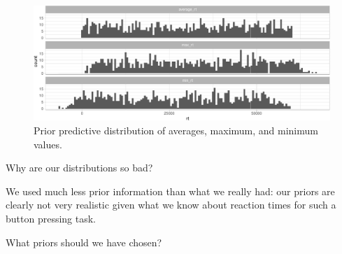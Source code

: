 \documentclass[12pt,ignorenonframetext,aspectratio=169]{beamer}
\newenvironment{Shaded}{\begin{snugshade}}{\end{snugshade}}
\newcommand{\DataTypeTok}[1]{\textcolor[rgb]{0.13,0.29,0.53}{#1}}
\newcommand{\DecValTok}[1]{\textcolor[rgb]{0.00,0.00,0.81}{#1}}
\newcommand{\KeywordTok}[1]{\textcolor[rgb]{0.13,0.29,0.53}{\textbf{#1}}}
\newcommand{\NormalTok}[1]{#1}
\newcommand{\OperatorTok}[1]{\textcolor[rgb]{0.81,0.36,0.00}{\textbf{#1}}}
\newcommand{\StringTok}[1]{\textcolor[rgb]{0.31,0.60,0.02}{#1}}
\begin{document}
\begin{frame}[fragile]



\scriptsize

\begin{Shaded}
\end{Shaded}

\begin{figure}
\centering
\includegraphics{03-compbayes-slides_files/figure-beamer/priorpred-stats-1.pdf}
\caption{\label{fig:priorpred-stats}Prior predictive distribution of averages, maximum, and minimum values.}
\end{figure}

\normalsize

\end{frame}

\begin{frame}

\begin{block}{Why are our distributions so bad?}

We used much less prior information than what we really had: our priors are clearly not very realistic given what we know about reaction times for such a button pressing task.

\end{block}

\begin{block}{What priors should we have chosen?}

\end{block}

\end{frame}
\end{document}
